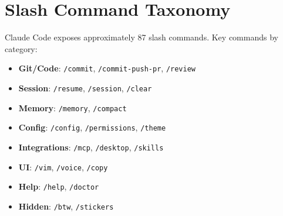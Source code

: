 \documentclass{article}
\begin{document}
\section{Slash Command Taxonomy}
\label{app:commands}

Claude Code exposes approximately 87 slash commands. Key commands by category:

\begin{itemize}
  \item \textbf{Git/Code}: \texttt{/commit}, \texttt{/commit-push-pr}, \texttt{/review}
  \item \textbf{Session}: \texttt{/resume}, \texttt{/session}, \texttt{/clear}
  \item \textbf{Memory}: \texttt{/memory}, \texttt{/compact}
  \item \textbf{Config}: \texttt{/config}, \texttt{/permissions}, \texttt{/theme}
  \item \textbf{Integrations}: \texttt{/mcp}, \texttt{/desktop}, \texttt{/skills}
  \item \textbf{UI}: \texttt{/vim}, \texttt{/voice}, \texttt{/copy}
  \item \textbf{Help}: \texttt{/help}, \texttt{/doctor}
  \item \textbf{Hidden}: \texttt{/btw}, \texttt{/stickers}
\end{itemize}
\end{document}

